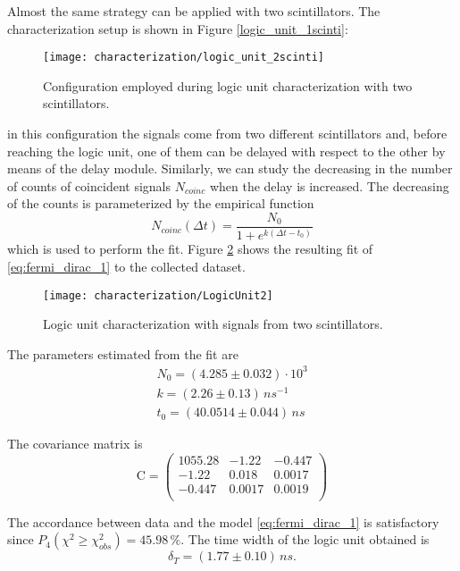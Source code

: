 Almost the same strategy can be applied with two scintillators. 
The characterization setup is shown in Figure \ref{logic_unit_1scinti}:
\begin{figure}[!h]
	\centering
	\texttt{[image: characterization/logic\_unit\_2scinti]}
	\caption{Configuration employed during logic unit characterization with two scintillators.}
	\label{logic_unit_2scinti}
\end{figure}
in this configuration the signals come from two different scintillators and, before reaching the logic unit, one of them can be delayed with respect to the other by means of the delay module. Similarly, we can study the decreasing in the number of counts of coincident signals $N_{coinc}$ when the delay is increased.
The decreasing of the counts is parameterized by the empirical function
\begin{equation} \label{eq:fermi_dirac_1}
N_{coinc}(\Delta t) = \frac{N_0}{1 + e^{k(\Delta t- t_0)}}
\end{equation}
which is used to perform the fit.
Figure \ref{fig:fit_2scinti} shows the resulting fit of \eqref{eq:fermi_dirac_1} to the collected dataset. 
\begin{figure}[!htp]
	\centering
	\texttt{[image: characterization/LogicUnit2]}
	\caption{Logic unit characterization with signals from two scintillators.} \label{fig:fit_2scinti}
\end{figure}
The parameters estimated from the fit are
\begin{equation}
\begin{array}{l}
N_0 = ( 4.285 \pm 0.032 ) \cdot 10^3 \\
k = ( 2.26 \pm 0.13 ) \,  \si{ns^{-1}} \\
t_0 = ( 40.0514 \pm 0.044 ) \,  \si{ns}
\end{array}
\end{equation}

\noindent The covariance matrix is
\begin{equation}
\textrm{C}=\left(
\begin{array}{ccc}
1055.28  &     -1.22    &   -0.447 \\
-1.22   &     0.018   &    0.0017 \\
-0.447   &    0.0017  &     0.0019 \\
\end{array}
\right)
\end{equation}

The accordance between data and the model \eqref{eq:fermi_dirac_1} is satisfactory since
$P_4\left(\chi^2\geq\chi_{obs}^2\right)=45.98\,\%$.
The time width of the logic unit obtained is
\begin{equation}
\delta_T = ( 1.77 \pm 0.10 ) \, \si{ns}.
\end{equation}


